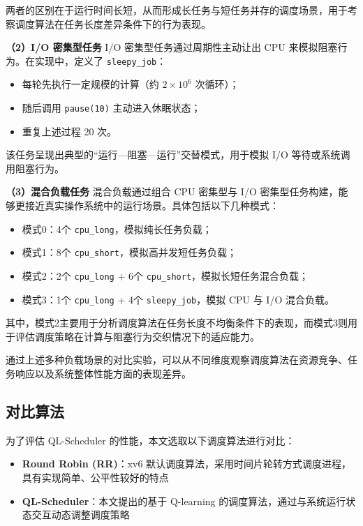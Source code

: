 两者的区别在于运行时间长短，从而形成长任务与短任务并存的调度场景，用于考察调度算法在任务长度差异条件下的行为表现。

\textbf{（2）I/O 密集型任务}  
I/O 密集型任务通过周期性主动让出 CPU 来模拟阻塞行为。在实现中，定义了 \texttt{sleepy\_job}：

\begin{itemize}
\item 每轮先执行一定规模的计算（约 $2\times10^6$ 次循环）；
\item 随后调用 \texttt{pause(10)} 主动进入休眠状态；
\item 重复上述过程 20 次。
\end{itemize}

该任务呈现出典型的“运行—阻塞—运行”交替模式，用于模拟 I/O 等待或系统调用阻塞行为。

\textbf{（3）混合负载任务}  
混合负载通过组合 CPU 密集型与 I/O 密集型任务构建，能够更接近真实操作系统中的运行场景。具体包括以下几种模式：

\begin{itemize}
\item 模式0：4个 \texttt{cpu\_long}，模拟纯长任务负载；
\item 模式1：8个 \texttt{cpu\_short}，模拟高并发短任务负载；
\item 模式2：2个 \texttt{cpu\_long} + 6个 \texttt{cpu\_short}，模拟长短任务混合负载；
\item 模式3：1个 \texttt{cpu\_long} + 4个 \texttt{sleepy\_job}，模拟 CPU 与 I/O 混合负载。
\end{itemize}

其中，模式2主要用于分析调度算法在任务长度不均衡条件下的表现，而模式3则用于评估调度策略在计算与阻塞行为交织情况下的适应能力。

通过上述多种负载场景的对比实验，可以从不同维度观察调度算法在资源竞争、任务响应以及系统整体性能方面的表现差异。

\subsection{对比算法}

为了评估 QL-Scheduler 的性能，本文选取以下调度算法进行对比：

\begin{itemize}
\item \textbf{Round Robin (RR)}：xv6 默认调度算法，采用时间片轮转方式调度进程，具有实现简单、公平性较好的特点
\item \textbf{QL-Scheduler}：本文提出的基于 Q-learning 的调度算法，通过与系统运行状态交互动态调整调度策略
\end{itemize}

